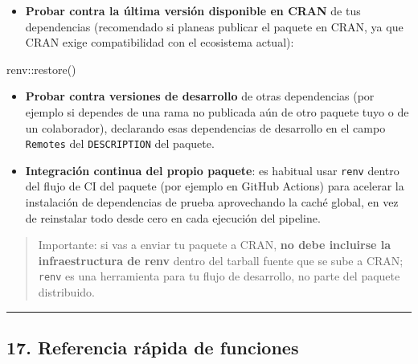 \documentclass[
  man,
  floatsintext,
  longtable,
  a4paper,
  nolmodern,
  notxfonts,
  notimes,
  12pt,
  colorlinks=true,linkcolor=blue,citecolor=blue,urlcolor=blue]{apa7}
\newenvironment{Shaded}{\begin{snugshade}}{\end{snugshade}}
\newcommand{\FunctionTok}[1]{\textcolor[rgb]{0.28,0.35,0.67}{#1}}
\newcommand{\NormalTok}[1]{\textcolor[rgb]{0.00,0.23,0.31}{#1}}
\newcommand{\SpecialCharTok}[1]{\textcolor[rgb]{0.37,0.37,0.37}{#1}}
\providecommand{\tightlist}{%
  \setlength{\itemsep}{0pt}\setlength{\parskip}{0pt}}
\begin{document}
\begin{itemize}
\tightlist
\item
  \textbf{Probar contra la última versión disponible en CRAN} de tus
  dependencias (recomendado si planeas publicar el paquete en CRAN, ya
  que CRAN exige compatibilidad con el ecosistema actual):
\end{itemize}

\begin{Shaded}
\begin{Highlighting}[]
\NormalTok{renv}\SpecialCharTok{::}\FunctionTok{restore}\NormalTok{()}
\end{Highlighting}
\end{Shaded}

\begin{itemize}
\item
  \textbf{Probar contra versiones de desarrollo} de otras dependencias
  (por ejemplo si dependes de una rama no publicada aún de otro paquete
  tuyo o de un colaborador), declarando esas dependencias de desarrollo
  en el campo \texttt{Remotes} del \texttt{DESCRIPTION} del paquete.
\item
  \textbf{Integración continua del propio paquete}: es habitual usar
  \texttt{renv} dentro del flujo de CI del paquete (por ejemplo en
  GitHub Actions) para acelerar la instalación de dependencias de prueba
  aprovechando la caché global, en vez de reinstalar todo desde cero en
  cada ejecución del pipeline.
\end{itemize}

\begin{quote}
Importante: si vas a enviar tu paquete a CRAN, \textbf{no debe incluirse
la infraestructura de renv} dentro del tarball fuente que se sube a
CRAN; \texttt{renv} es una herramienta para tu flujo de desarrollo, no
parte del paquete distribuido.
\end{quote}

\begin{center}\rule{0.5\linewidth}{0.5pt}\end{center}

\subsection{17. Referencia rápida de
funciones}\label{referencia-ruxe1pida-de-funciones}
\end{document}

